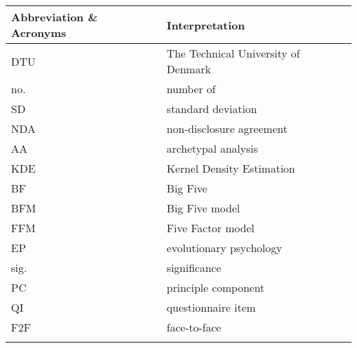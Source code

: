 \begin{longtable}{m{2.5cm} m{6.0cm} m{2.5cm}}
Abbreviation \& Acronyms \T \B & Interpretation \T \B & \T \B  \\

\hline 
DTU \T& \multicolumn{2}{l}{The Technical University of Denmark} \\
no. \T& \multicolumn{2}{l}{number of} \\
SD \T& \multicolumn{2}{l}{standard deviation} \\
NDA \T& \multicolumn{2}{l}{non-disclosure agreement} \\
AA \T& \multicolumn{2}{l}{archetypal analysis} \\
KDE \T& \multicolumn{2}{l}{Kernel Density Estimation} \\
BF \T& \multicolumn{2}{l}{Big Five} \\
BFM \T& \multicolumn{2}{l}{Big Five model} \\
FFM \T& \multicolumn{2}{l}{Five Factor model} \\
EP \T& \multicolumn{2}{l}{evolutionary psychology} \\
sig. \T& \multicolumn{2}{l}{significance} \\
PC \T& \multicolumn{2}{l}{principle component} \\
QI \T& \multicolumn{2}{l}{questionnaire item} \\
F2F \T& \multicolumn{2}{l}{face-to-face} \\

\\
\end{longtable}

